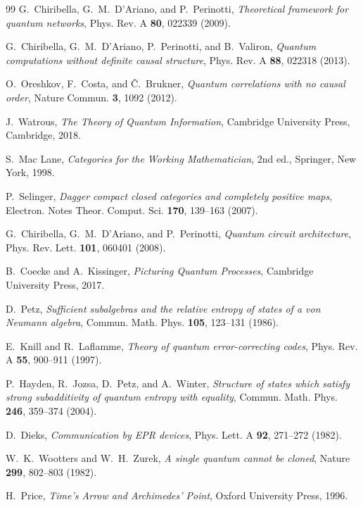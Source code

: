 \documentclass[11pt,a4paper]{article}
\theoremstyle{definition}
\theoremstyle{plain}
\theoremstyle{remark}
\begin{document}
\begin{thebibliography}{99}
G.~Chiribella, G.~M.~D'Ariano, and P.~Perinotti,
\emph{Theoretical framework for quantum networks},
Phys. Rev. A \textbf{80}, 022339 (2009).

G.~Chiribella, G.~M.~D'Ariano, P.~Perinotti, and B.~Valiron,
\emph{Quantum computations without definite causal structure},
Phys. Rev. A \textbf{88}, 022318 (2013).

O.~Oreshkov, F.~Costa, and \v{C}.~Brukner,
\emph{Quantum correlations with no causal order},
Nature Commun. \textbf{3}, 1092 (2012).

J.~Watrous,
\emph{The Theory of Quantum Information},
Cambridge University Press, Cambridge, 2018.

S.~Mac Lane,
\emph{Categories for the Working Mathematician}, 2nd ed.,
Springer, New York, 1998.

P.~Selinger,
\emph{Dagger compact closed categories and completely positive maps},
Electron. Notes Theor. Comput. Sci. \textbf{170}, 139--163 (2007).

G.~Chiribella, G.~M.~D'Ariano, and P.~Perinotti,
\emph{Quantum circuit architecture},
Phys. Rev. Lett. \textbf{101}, 060401 (2008).

B.~Coecke and A.~Kissinger,
\emph{Picturing Quantum Processes},
Cambridge University Press, 2017.

D.~Petz,
\emph{Sufficient subalgebras and the relative entropy of states of a von Neumann algebra},
Commun. Math. Phys. \textbf{105}, 123--131 (1986).

E.~Knill and R.~Laflamme,
\emph{Theory of quantum error-correcting codes},
Phys. Rev. A \textbf{55}, 900--911 (1997).

P.~Hayden, R.~Jozsa, D.~Petz, and A.~Winter,
\emph{Structure of states which satisfy strong subadditivity of quantum entropy with equality},
Commun. Math. Phys. \textbf{246}, 359--374 (2004).

D.~Dieks,
\emph{Communication by EPR devices},
Phys. Lett. A \textbf{92}, 271--272 (1982).

W.~K.~Wootters and W.~H.~Zurek,
\emph{A single quantum cannot be cloned},
Nature \textbf{299}, 802--803 (1982).

H.~Price,
\emph{Time's Arrow and Archimedes' Point},
Oxford University Press, 1996.


\end{thebibliography}
\end{document}
